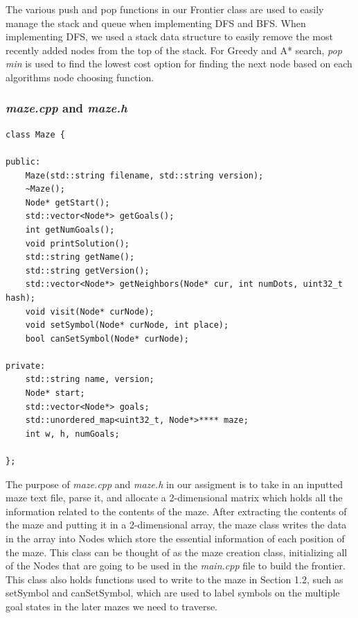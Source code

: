 \documentclass[titlepage]{article}
\begin{document}
The various push and pop functions in our Frontier class are used to easily manage the stack and queue when implementing DFS and BFS. When implementing DFS, we used a stack data structure to easily remove the most recently added nodes from the top of the stack. For Greedy and A* search, \textit{pop min} is used to find the lowest cost option for finding the next node based on each algorithms node choosing function. 

\subsubsection{\textit{maze.cpp} and \textit{maze.h}}
\begin{lstlisting}
class Maze {

public:
    Maze(std::string filename, std::string version);
    ~Maze();
    Node* getStart();
    std::vector<Node*> getGoals();
    int getNumGoals();
    void printSolution();
    std::string getName();
    std::string getVersion();
    std::vector<Node*> getNeighbors(Node* cur, int numDots, uint32_t hash);
    void visit(Node* curNode);
    void setSymbol(Node* curNode, int place);
    bool canSetSymbol(Node* curNode);

private:
    std::string name, version;
    Node* start;
    std::vector<Node*> goals;
    std::unordered_map<uint32_t, Node*>**** maze;
    int w, h, numGoals;

};
\end{lstlisting}

The purpose of \textit{maze.cpp} and \textit{maze.h} in our assigment is to take in an inputted maze text file, parse it, and allocate a 2-dimensional matrix which holds all the information related to the contents of the maze. After extracting the contents of the maze and putting it in a 2-dimensional array, the maze class writes the data in the array into Nodes which store the essential information of each position of the maze. This class can be thought of as the maze creation class, initializing all of the Nodes that are going to be used in the \textit{main.cpp} file to build the frontier. This class also holds functions used to write to the maze in Section 1.2, such as setSymbol and canSetSymbol, which are used to label symbols on the multiple goal states in the later mazes we need to traverse.
\end{document}
